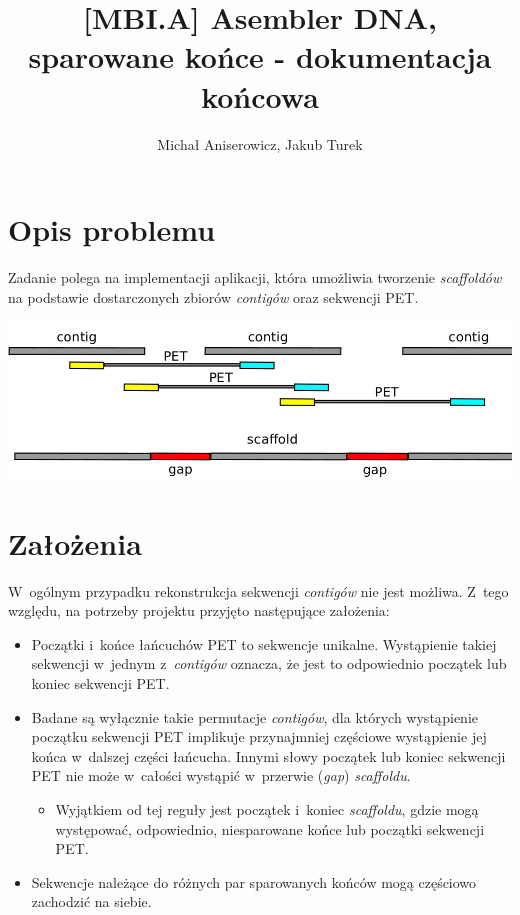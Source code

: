 \documentclass[a4paper,10pt]{article}
\title{[MBI.A] Asembler DNA, sparowane końce - dokumentacja końcowa}
\author{Michał Aniserowicz, Jakub Turek}
\date{}
\begin{document}
\maketitle

\section*{Opis problemu}

Zadanie polega na implementacji aplikacji, która umożliwia tworzenie \emph{scaffoldów} na podstawie dostarczonych zbiorów \emph{contigów} oraz sekwencji PET. 

\begin{center}
  \includegraphics[width=.9\textwidth]{contig_pet.png}
\end{center}

\section*{Założenia}

W~ogólnym przypadku rekonstrukcja sekwencji \emph{contigów} nie jest możliwa. Z~tego względu, na potrzeby projektu przyjęto następujące założenia:

\begin{itemize}
  \item Początki i~końce łańcuchów PET to sekwencje unikalne. Wystąpienie takiej sekwencji w~jednym z~\emph{contigów} oznacza, że jest to odpowiednio początek lub koniec sekwencji PET.
  \item Badane są wyłącznie takie permutacje \emph{contigów}, dla których wystąpienie początku sekwencji PET implikuje przynajmniej częściowe wystąpienie jej końca w~dalszej części łańcucha. Innymi słowy początek lub koniec sekwencji PET nie może w~całości wystąpić w~przerwie (\emph{gap}) \emph{scaffoldu}.
  
    \begin{itemize}
	  \item Wyjątkiem od tej reguły jest początek i~koniec \emph{scaffoldu}, gdzie mogą występować, odpowiednio, niesparowane końce lub początki sekwencji PET.
    \end{itemize}
  
  \item Sekwencje należące do różnych par sparowanych końców mogą częściowo zachodzić na siebie.
\end{itemize}
\end{document}
